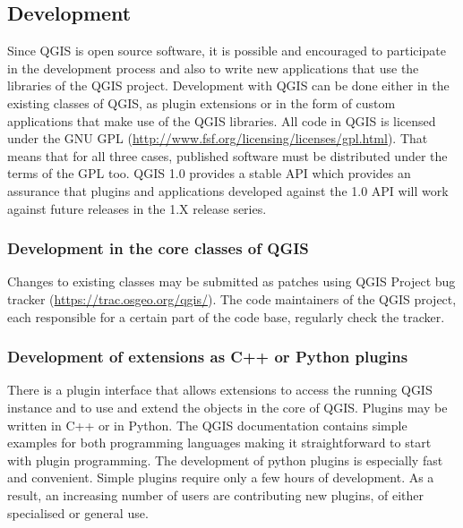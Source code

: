 \subsection{Development}


Since QGIS is open source software, it is possible and encouraged to participate
in the development
process and also to write new applications that use the libraries of the QGIS
project. Development with QGIS can be done either in the existing classes of
QGIS, as plugin extensions or in the form of custom applications that make use
of the QGIS libraries. All code in QGIS is licensed under the
GNU GPL (\url{http://www.fsf.org/licensing/licenses/gpl.html}). That means that
for all three cases, published software must be
distributed under the terms of the GPL too. QGIS 1.0 provides a stable API
which 
provides an assurance that plugins and applications developed against the 1.0
API 
will work against future releases in the 1.X release series.

\subsubsection{Development in the core classes of QGIS}
Changes to existing classes may be submitted as patches using QGIS Project bug
tracker (\url{https://trac.osgeo.org/qgis/}). The code maintainers of the QGIS
project, each responsible for a certain part of the code base, regularly check
the tracker.

\subsubsection{Development of extensions as C++ or Python plugins}
There is a plugin interface that allows extensions to access the running QGIS
instance and to use and extend the objects in the core of QGIS. Plugins may be
written in C++ or in Python. The QGIS documentation contains simple examples
for both programming languages making it straightforward to start with plugin 
programming. The development of python plugins is especially fast and
convenient. Simple plugins require only a few hours of development. As a result,
an increasing number of users are contributing new plugins, of either
specialised or general use.

